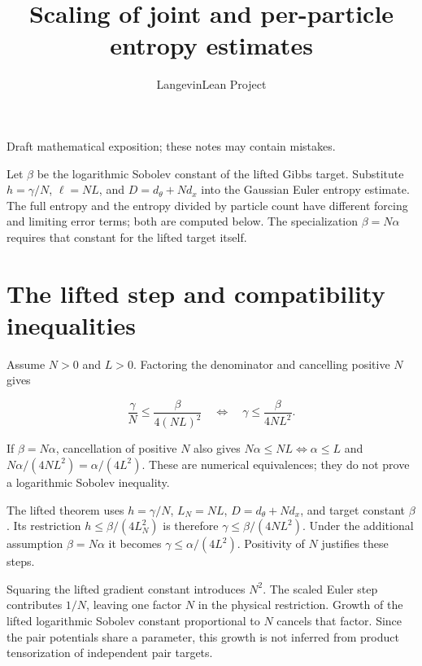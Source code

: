 \documentclass[11pt,a4paper]{article}
\title{\texorpdfstring{Scaling of joint and per-particle entropy estimates}{Scaling of joint and per-particle entropy estimates}}
\author{LangevinLean Project}
\date{}
\begin{document}
\maketitle
Draft mathematical exposition; these notes may contain mistakes.


Let \(\beta\) be the logarithmic Sobolev constant of the lifted Gibbs target. Substitute \(h=\gamma/N\), \(\ell=NL\), and \(D=d_\theta+Nd_x\) into the Gaussian Euler entropy estimate. The full entropy and the entropy divided by particle count have different forcing and limiting error terms; both are computed below. The specialization \(\beta=N\alpha\) requires that constant for the lifted target itself.


\section{\texorpdfstring{The lifted step and compatibility inequalities}{The lifted step and compatibility inequalities}}


Assume \(N>0\) and \(L>0\). Factoring the denominator and cancelling positive \(N\) gives

\[\frac\gamma N\le\frac\beta{4(NL)^2}\quad\Longleftrightarrow\quad\gamma\le\frac\beta{4NL^2}.\]

If \(\beta=N\alpha\), cancellation of positive \(N\) also gives \(N\alpha\le NL\Longleftrightarrow\alpha\le L\) and \(N\alpha/(4NL^2)=\alpha/(4L^2)\). These are numerical equivalences; they do not prove a logarithmic Sobolev inequality.



The lifted theorem uses \(h=\gamma/N\), \(L_N=NL\), \(D=d_\theta+Nd_x\), and target constant \(\beta\). Its restriction \(h\le\beta/(4L_N^2)\) is therefore \(\gamma\le\beta/(4NL^2)\). Under the additional assumption \(\beta=N\alpha\) it becomes \(\gamma\le\alpha/(4L^2)\). Positivity of \(N\) justifies these steps.



Squaring the lifted gradient constant introduces \(N^2\). The scaled Euler step contributes \(1/N\), leaving one factor \(N\) in the physical restriction. Growth of the lifted logarithmic Sobolev constant proportional to \(N\) cancels that factor. Since the pair potentials share a parameter, this growth is not inferred from product tensorization of independent pair targets.
\end{document}
